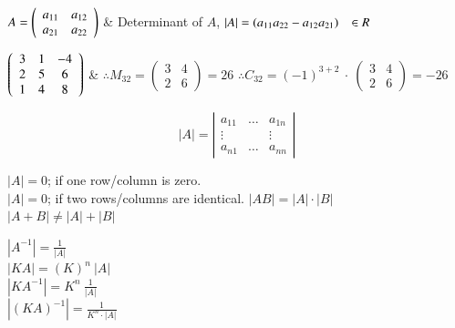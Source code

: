 \documentclass[12pt]{article}
\renewenvironment{pmatrix}
{\left(\begin{array}{ccc}}
{\end{array}\right)}
\begin{document}
\pagebreak
\vspace*{-\baselineskip}

\begin{csplit}[c]
   $A= \begin{pmatrix}
      a_{11} & a_{12} \\ a_{21} & a_{22}
   \end{pmatrix} $
   \tabs & \tabs
   Determinant of $A$, \tab $|A| = (a_{11} a_{22}-a_{12} a_{21}) \ \ \  \in R$
\end{csplit}


\begin{csplit}[c]
   $\begin{pmatrix}
      3 & 1 & -4 \\ 2 & 5 & 6 \\ 1 & 4 & 8
   \end{pmatrix}$
   \tabs & \tabs
   $\therefore M_{32}=\left(\begin{array}{ll}
      3 & 4 \\ 2 & 6
   \end{array}\right)=26$
   \tabs \tabs
   $\therefore C_{32}= (-1)^{3+2} \ \cdot \
   \left(\begin{array}{ll}
      3 & 4 \\ 2 & 6
   \end{array}\right) = -26$
\end{csplit}


\vspace*{1ex}
\begin{minipage}[t]{0.2\textwidth}
   \vspace*{-\baselineskip}
   \begin{equation*}
      |A| = \left|\begin{array}{cccc}
      a_{11} & \ldots & a_{1n} \\
      \vdots & & \vdots \\
      a_{n1} & \ldots & a_{nn}
      \end{array}\right|
   \end{equation*}
\end{minipage}
\hspace{1.25cm}
\begin{minipage}[t]{0.45\textwidth}
   $|A| = 0$; if one row/column is zero.\\
   $|A| = 0$; if two rows/columns are identical.
   $|AB| = |A| \cdot |B|$\\
   $|A+B| \neq |A|+|B|$
\end{minipage}
\hspace{0.6cm}
\begin{minipage}[t]{0.2\textwidth}
   $|A^{-1}| = \frac{1}{|A|}$ \\
   $|KA| = (K)^n\ |A|$ \\
   $|KA^{-1}| = K^n\ \frac{1}{|A|}$ \\
   $|(KA)^{-1}| = \frac{1}{K^n \cdot |A|}$
 \end{minipage}
\end{document}
